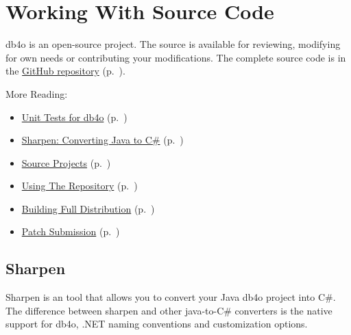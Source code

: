 \section{Working With Source Code}
\label{ref:community-working-with-source-code}

db4o is an open-source project. The source is available for reviewing, modifying for own needs or contributing your modifications. The complete source code is in the \hyperref[ref:community-working-with-source-using-the-repository]{GitHub repository} (p.~\pageref{ref:community-working-with-source-using-the-repository}).

More Reading:

\begin{itemize}
\item \hyperref[ref:community-working-with-source-db4o-testing-framework]{Unit Tests for db4o} (p.~\pageref{ref:community-working-with-source-db4o-testing-framework})
\item \hyperref[ref:community-working-with-source-sharpen]{Sharpen: Converting Java to C\#} (p.~\pageref{ref:community-working-with-source-sharpen})
\item \hyperref[ref:community-working-with-source-using-the-sources-from-db4o-distribution]{Source Projects} (p.~\pageref{ref:community-working-with-source-using-the-sources-from-db4o-distribution})
\item \hyperref[ref:community-working-with-source-using-the-repository]{Using The Repository} (p.~\pageref{ref:community-working-with-source-using-the-repository})
\item \hyperref[ref:community-working-with-source-building-full-distribution]{Building Full Distribution} (p.~\pageref{ref:community-working-with-source-building-full-distribution})
\item \hyperref[ref:community-working-with-source-patch-submission]{Patch Submission} (p.~\pageref{ref:community-working-with-source-patch-submission})
\end{itemize}

\subsection{Sharpen}
\label{ref:community-working-with-source-sharpen}

Sharpen is an tool that allows you to convert your Java db4o project into C\#. The difference between sharpen and other java-to-C\# converters is the native support for db4o, .NET naming conventions and customization options.

